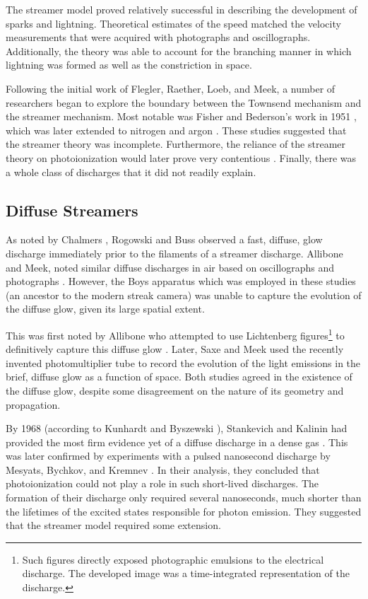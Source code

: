The streamer model proved relatively successful in describing the development of
sparks and lightning. Theoretical estimates of the speed matched the velocity
measurements that were acquired with photographs and oscillographs.
Additionally, the theory was able to account for the branching manner in which
lightning was formed as well as the constriction in space.

Following the initial work of Flegler, Raether, Loeb, and Meek, a number of
researchers began to explore the boundary between the Townsend mechanism and the
streamer mechanism. Most notable was Fisher and Bederson's work in 1951
\cite{Fisher1951}, which was later extended to nitrogen \cite{Kachickas1952} and
argon \cite{Kachickas1953}. These studies suggested that the streamer theory was
incomplete. Furthermore, the reliance of the streamer theory on photoionization
would later prove very contentious \cite{Kunhardt1988}. Finally, there was a
whole class of discharges that it did not readily explain.

\subsection{Diffuse Streamers}

As noted by Chalmers \cite{Chalmers1971}, Rogowski and Buss \cite{Rogowski1927,
Buss1932} observed a fast, diffuse, glow discharge immediately prior to the
filaments of a streamer discharge. Allibone and Meek, noted similar diffuse
discharges in air based on oscillographs and photographs \cite{Allibone1938,
Allibone1938b, Allibone1938c}. However, the Boys apparatus \cite{Boys1926} which
was employed in these studies (an ancestor to the modern streak camera) was
unable to capture the evolution of the diffuse glow, given its large spatial
extent.

This was first noted by Allibone who attempted to use Lichtenberg
figures\footnote{Such figures directly exposed photographic emulsions to the
electrical discharge. The developed image was a time-integrated representation
of the discharge.} to definitively capture this diffuse glow
\cite{Allibone1948}. Later, Saxe and Meek used the recently invented
photomultiplier tube to record the evolution of the light emissions in the
brief, diffuse glow \cite{Saxe1948} as a function of space. Both studies
agreed in the existence of the diffuse glow, despite some disagreement on the
nature of its geometry and propagation.

By 1968 (according to Kunhardt and Byszewski \cite{Kunhardt1980}), Stankevich
and Kalinin had provided the most firm evidence yet of a diffuse discharge in a
dense gas \cite{Stankevich1968}. This was later confirmed by experiments with a
pulsed nanosecond discharge by Mesyats, Bychkov, and Kremnev \cite{Mesyats1972}.
In their analysis, they concluded that photoionization could not play a role in
such short-lived discharges. The formation of their discharge only required
several nanoseconds, much shorter than the lifetimes of the excited states
responsible for photon emission. They suggested that the streamer model required
some extension.

